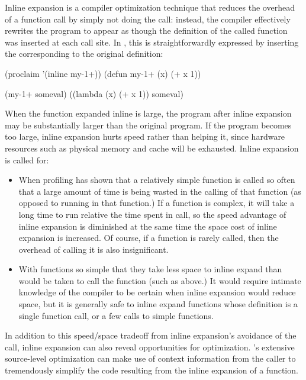 {Inline expansion is a compiler optimization technique that reduces
the overhead of a function call by simply not doing the call:
instead, the compiler effectively rewrites the program to appear as
though the definition of the called function was inserted at each
call site.  In \llisp, this is straightforwardly expressed by
inserting the  corresponding to the original definition:
\begin{lisp}
(proclaim '(inline my-1+))
(defun my-1+ (x) (+ x 1))

(my-1+ someval) \result{} ((lambda (x) (+ x 1)) someval)
\end{lisp}

When the function expanded inline is large, the program after inline expansion
may be substantially larger than the original program.  If the program becomes
too large, inline expansion hurts speed rather than helping it, since hardware
resources such as physical memory and cache will be exhausted.  Inline
expansion is called for:
\begin{itemize}

\item
When profiling has shown that a relatively simple function is called
so often that a large amount of time is being wasted in the calling
of that function (as opposed to running in that function.)  If a
function is complex, it will take a long time to run relative the
time spent in call, so the speed advantage of inline expansion is
diminished at the same time the space cost of inline expansion is
increased.  Of course, if a function is rarely called, then the
overhead of calling it is also insignificant.

\item
With functions so simple that they take less space to inline expand than would
be taken to call the function (such as  above.)  It would require
intimate knowledge of the compiler to be certain when inline expansion would
reduce space, but it is generally safe to inline expand functions whose
definition is a single function call, or a few calls to simple \clisp{}
functions.
\end{itemize}


In addition to this speed/space tradeoff from inline expansion's avoidance of
the call, inline expansion can also reveal opportunities for optimization.
\python{}'s extensive source-level optimization can make use of context
information from the caller to tremendously simplify the code resulting from
the inline expansion of a function.

}
